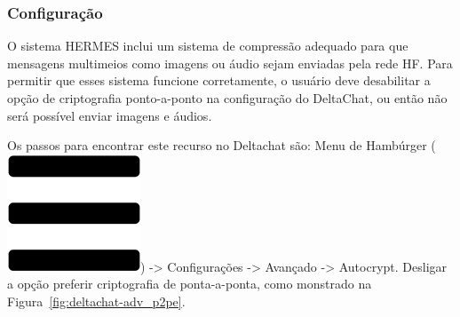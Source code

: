 \documentclass[11pt,a4paper]{article}
\begin{document}


\subsubsection{Configuração}

O sistema HERMES inclui um sistema de compressão adequado para que mensagens multimeios como imagens ou áudio sejam enviadas pela rede HF. Para permitir que esses sistema funcione corretamente, o usuário deve desabilitar a opção de criptografia ponto-a-ponto na configuração do DeltaChat, ou então não será possível enviar imagens e áudios.


Os passos para encontrar este recurso no Deltachat são: Menu de Hambúrger (\includegraphics[height=0.78\baselineskip]{pictures/burger.png}) -> Configurações -> Avançado -> Autocrypt. Desligar a opção preferir criptografia de ponta-a-ponta, como monstrado na Figura~\ref{fig:deltachat-adv_p2pe}.

\end{document}
